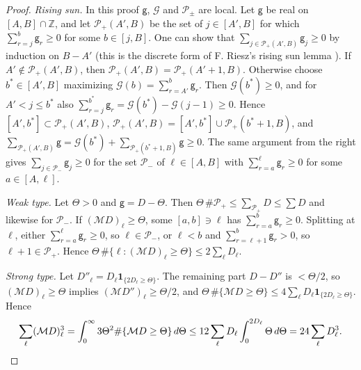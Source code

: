\documentclass[11pt,a4paper]{article}
\makeatletter
\numberwithin{equation}{section}
\DeclareRobustCommand{\CGcite}[2][]{\if\relax\detokenize{#1}\relax\cite{#2}\else\cite[#1]{#2}\fi}
\newcommand{\CG@getbib}[1]{\@ifundefined{CGBib@#1}{#1}{\csname CGBib@#1\endcsname}}
\DeclareRobustCommand{\CGcite}[2][]{\pdftooltip{\if\relax\detokenize{#1}\relax\cite{#2}\else\cite[#1]{#2}\fi}{\CG@getbib{#2}}}
\theoremstyle{definition}
\theoremstyle{remark}
\newcommand{\M}{\mathcal M}
\newcommand{\Ind}{\mathbf 1}
\newcommand{\Z}{\mathbb Z}
\makeatother
\begin{document}
\begin{proof}
\emph{Rising sun.} In this proof $\mathsf g$, $\mathcal G$ and $\mathcal P_\pm$ are local. Let $\mathsf g$ be real on $[A,B]\cap\Z$, and let $\mathcal P_+(A',B)$ be the set of $j\in[A',B]$ for which $\sum_{r=j}^b\mathsf g_r\ge0$ for some $b\in[j,B]$. One can show that $\sum_{j\in \mathcal P_+(A',B)}\mathsf g_j\ge0$ by induction on $B-A'$ (this is the discrete form of F. Riesz's rising sun lemma \CGcite{Riesz1932}). If $A'\notin \mathcal P_+(A',B)$, then $\mathcal P_+(A',B)=\mathcal P_+(A'+1,B)$. Otherwise choose $b^*\in[A',B]$ maximizing $\mathcal G(b)=\sum_{r=A'}^b\mathsf g_r$. Then $\mathcal G(b^*)\ge0$, and for $A'<j\le b^*$ also $\sum_{r=j}^{b^*}\mathsf g_r=\mathcal G(b^*)-\mathcal G(j-1)\ge0$. Hence $[A',b^*]\subset \mathcal P_+(A',B)$, $\mathcal P_+(A',B)=[A',b^*]\cup \mathcal P_+(b^*+1,B)$, and $\sum_{\mathcal P_+(A',B)}\mathsf g=\mathcal G(b^*)+\sum_{\mathcal P_+(b^*+1,B)}\mathsf g\ge0$. The same argument from the right gives $\sum_{j\in\mathcal P_-}\mathsf g_j\ge0$ for the set $\mathcal P_-$ of $\ell\in[A,B]$ with $\sum_{r=a}^\ell \mathsf g_r\ge0$ for some $a\in[A,\ell]$.

\emph{Weak type.} Let $\Theta>0$ and $\mathsf g=D-\Theta$. Then $\Theta\,\#\mathcal P_+\le\sum_{\mathcal P_+}D\le\sum D$ and likewise for $\mathcal P_-$. If $(\M D)_\ell\ge\Theta$, some $[a,b]\ni\ell$ has $\sum_{r=a}^b\mathsf g_r\ge0$. Splitting at $\ell$, either $\sum_{r=a}^{\ell}\mathsf g_r\ge0$, so $\ell\in\mathcal P_-$, or $\ell<b$ and $\sum_{r=\ell+1}^b\mathsf g_r>0$, so $\ell+1\in\mathcal P_+$. Hence $\Theta\,\#\{\ell:(\M D)_\ell\ge\Theta\}\le2\sum_\ell D_\ell$.

\emph{Strong type.} Let $D''_\ell=D_\ell\Ind_{\{2D_\ell\ge\Theta\}}$. The remaining part $D-D''$ is $<\Theta/2$, so $(\M D)_\ell\ge\Theta$ implies $(\M D'')_\ell\ge\Theta/2$, and $\Theta\,\#\{\M D\ge\Theta\}\le4\sum_\ell D_\ell\Ind_{\{2D_\ell\ge\Theta\}}$. Hence
\[
\sum_\ell(\M D)_\ell^3=\int_0^\infty3\Theta^2\#\{\M D\ge\Theta\}\,d\Theta\le12\sum_\ell D_\ell\int_0^{2D_\ell}\Theta\,d\Theta=24\sum_\ell D_\ell^3 .\qedhere
\]
\end{proof}
\end{document}
